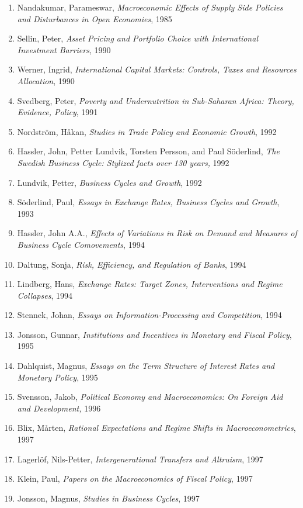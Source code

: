\begin{spacing}{.5}
\begin{enumerate}
{Wage Formation and International Trade}, 1983
\item Nandakumar, Parameswar,\emph{ Macroeconomic Effects of Supply Side
Policies and Disturbances in Open Economies}, 1985
\item Sellin, Peter,\emph{ Asset Pricing and Portfolio Choice with 
International
Investment Barriers}, 1990
\item Werner, Ingrid,\emph{ International Capital Markets: Controls, Taxes
and Resources Allocation}, 1990
\item Svedberg, Peter,\emph{ Poverty and Undernutrition in Sub-Saharan Africa:
Theory, Evidence, Policy}, 1991
\item Nordstr\"om, H\aa kan,\emph{ Studies in Trade Policy and Economic Growth},
1992
\item Hassler, John, Petter Lundvik, Torsten Persson, and Paul S\"oderlind,
\emph{The Swedish Business Cycle: Stylized facts over 130 years,}
1992
\item Lundvik, Petter,\emph{ Business Cycles and Growth}, 1992
\item S\"oderlind, Paul,\emph{ Essays in Exchange Rates, Business Cycles and
Growth}, 1993
\item Hassler, John A.A.,\emph{ Effects of Variations in Risk on Demand
and Measures of Business Cycle Comovements}, 1994
\item Daltung, Sonja,\emph{ Risk, Efficiency, and Regulation of Banks},
1994
\item Lindberg, Hans,\emph{ Exchange Rates: Target Zones, Interventions
and Regime Collapses}, 1994
\item Stennek, Johan,\emph{ Essays on Information-Processing and Competition},
1994
\item Jonsson, Gunnar,\emph{ Institutions and Incentives in Monetary and
Fiscal Policy}, 1995
\item Dahlquist, Magnus,\emph{ Essays on the Term Structure of Interest
Rates and Monetary Policy}, 1995
\item Svensson, Jakob,\emph{ Political Economy and Macroeconomics: On Foreign
Aid and Development,} 1996
\item Blix, M\aa rten,\emph{ Rational Expectations and Regime Shifts in 
Macroeconometrics},
1997
\item Lagerl\"of, Nils-Petter,\emph{ Intergenerational Transfers and Altruism},
1997
\item Klein, Paul,\emph{ Papers on the Macroeconomics of Fiscal Policy},
1997
\item Jonsson, Magnus,\emph{ Studies in Business Cycles}, 1997

\end{enumerate}
\end{spacing}
